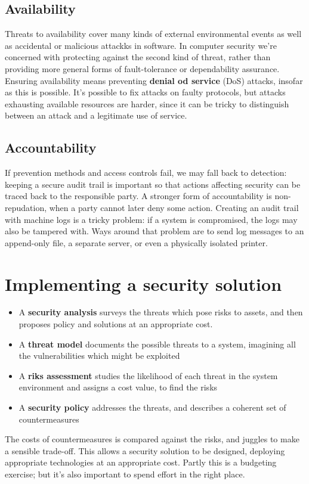 \documentclass[12pt, a4paper]{report}
\begin{document}
\subsection{Availability}
Threats to availability cover many kinds of external environmental events as well as accidental or malicious attackks in software. In computer security we're concerned with protecting against the second kind of threat, rather than providing more general forms of fault-tolerance or dependability assurance. Ensuring availability means preventing \textbf{denial od service} (DoS) attacks, insofar as this is possible. It's possible to fix attacks on faulty protocols, but attacks exhausting available resources are harder, since it can  be tricky to distinguish between an attack and a  legitimate use of service.
\subsection{Accountability}
If prevention methods and access controls fail, we may fall back to detection: keeping  a secure audit trail is important so that actions affecting security can be traced back to the responsible party. A stronger form of accountability is non-repudation, when a party cannot later deny some action. Creating an audit trail with machine logs is a tricky problem: if a system is compromised, the logs may also be tampered with. Ways around that problem are to send log messages to an append-only file, a separate server, or even a physically isolated printer.
\section{Implementing a security solution}
\begin{itemize}
    \item A \textbf{security analysis} surveys the threats which pose risks to assets, and then proposes policy and solutions at an appropriate cost.
    \item A \textbf{threat model} documents the possible threats to a system, imagining all the vulnerabilities which might be exploited
    \item A \textbf{riks assessment} studies the likelihood of each threat in the system environment and assigns a cost value, to find the risks
    \item A \textbf{security policy} addresses the threats, and describes a coherent set of countermeasures
\end{itemize}
The costs of countermeasures is compared against the risks, and juggles to make a sensible trade-off. This allows a security solution to be designed, deploying appropriate technologies at an appropriate cost. Partly this is a budgeting exercise; but it's also important to spend effort in the right place.
\end{document}
